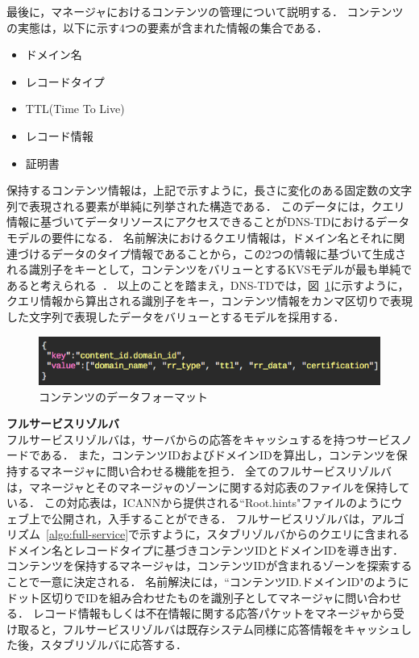\newpage
最後に，マネージャにおけるコンテンツの管理について説明する．
コンテンツの実態は，以下に示す4つの要素が含まれた情報の集合である．
\begin{itemize}
 \item ドメイン名
 \vspace{-3mm}
 \item レコードタイプ
 \vspace{-3mm}
 \item TTL(Time To Live)
 \vspace{-3mm}
 \item レコード情報
 \vspace{-3mm}
 \item 証明書
\end{itemize}
保持するコンテンツ情報は，上記で示すように，長さに変化のある固定数の文字列で表現される要素が単純に列挙された構造である．
このデータには，クエリ情報に基づいてデータリソースにアクセスできることがDNS-TDにおけるデータモデルの要件になる．
名前解決におけるクエリ情報は，ドメイン名とそれに関連づけるデータのタイプ情報であることから，この2つの情報に基づいて生成される識別子をキーとして，コンテンツをバリューとするKVSモデルが最も単純であると考えられる~\cite{Davoudian}．
以上のことを踏まえ，DNS-TDでは，図~\ref{fig:manager-provider}に示すように，クエリ情報から算出される識別子をキー，コンテンツ情報をカンマ区切りで表現した文字列で表現したデータをバリューとするモデルを採用する．
\begin{figure}[h]
 \centering
 \includegraphics[scale=0.6]{figure/content-file.png}
 \caption{コンテンツのデータフォーマット}
 \label{fig:manager-provider}
\end{figure}

\hspace{-12pt}\textbf{フルサービスリゾルバ}\\
\hspace{12pt}フルサービスリゾルバは，サーバからの応答をキャッシュするを持つサービスノードである．
また，コンテンツIDおよびドメインIDを算出し，コンテンツを保持するマネージャに問い合わせる機能を担う．
全てのフルサービスリゾルバは，マネージャとそのマネージャのゾーンに関する対応表のファイルを保持している．
この対応表は，ICANNから提供される``Root.hints"ファイルのようにウェブ上で公開され，入手することができる．
フルサービスリゾルバは，アルゴリズム~\ref{algo:full-service}で示すように，スタブリゾルバからのクエリに含まれるドメイン名とレコードタイプに基づきコンテンツIDとドメインIDを導き出す．
コンテンツを保持するマネージャは，コンテンツIDが含まれるゾーンを探索することで一意に決定される．
名前解決には，``コンテンツID.ドメインID"のようにドット区切りでIDを組み合わせたものを識別子としてマネージャに問い合わせる．
レコード情報もしくは不在情報に関する応答パケットをマネージャから受け取ると，フルサービスリゾルバは既存システム同様に応答情報をキャッシュした後，スタブリゾルバに応答する．



